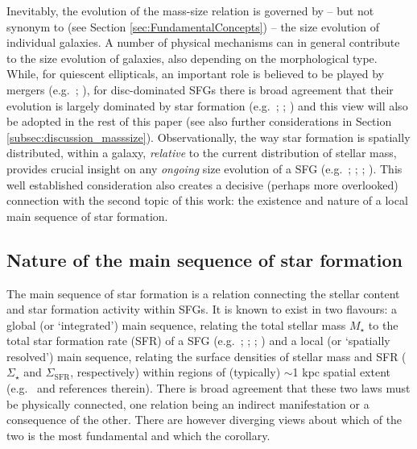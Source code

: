 \documentclass[fleqn,usenatbib]{mnras}
\begin{document}
Inevitably, the evolution of the mass-size relation is governed by -- but not synonym to (see Section \ref{sec:FundamentalConcepts}) -- the size evolution of individual galaxies. A number of physical mechanisms can in general contribute to the size evolution of galaxies, also depending on the morphological type. While, for quiescent ellipticals, an important role is believed to be played by mergers (e.g.\ \citealt{Posti+14}; \citealt{vanDokkum+15}), for disc-dominated SFGs there is broad agreement that their evolution is largely dominated by star formation (e.g.\ \citealt{NaabOstriker2006}; \citealt{DuttonvdB2009}; \citealt{Buck+20}) and this view will also be adopted in the rest of this paper (see also further considerations in Section \ref{subsec:discussion_masssize}). Observationally, the way star formation is spatially distributed, within a galaxy, \emph{relative} to the current distribution of stellar mass, provides crucial insight on any \emph{ongoing} size evolution of a SFG (e.g.\ \citealt{MM07}; \citealt{P+15}; \citealt{Nelson+16}; 
\citealt{Wilman+20}). This well established consideration also creates a decisive (perhaps more overlooked) connection with the second topic of this work: the existence and nature of a local main sequence of star formation.


\subsection{Nature of the main sequence of star formation}\label{subsec:intro_mainsequence}
The main sequence of star formation is a relation connecting the stellar content and star formation activity within SFGs. It is known to exist in two flavours: a global (or `integrated') main sequence, relating the total stellar mass $M_\star$ to the total star formation rate (SFR) of a SFG (e.g.\ \citealt{Brinchmann+04}; \citealt{Elbaz+07}; \citealt{Speagle+14}; \citealt{RenziniPeng2015}) and a local (or `spatially resolved') main sequence, relating the surface densities of stellar mass and SFR ($\Sigma_\star$ and $\Sigma_\textrm{SFR}$, respectively) within regions of (typically) $\sim$1 kpc spatial extent (e.g.\ \citealt{Sanchez2020} and references therein). There is broad agreement that these two laws must be physically connected, one relation being an indirect manifestation or a consequence of the other. There are however diverging views about which of the two is the most fundamental and which the corollary.
\end{document}
